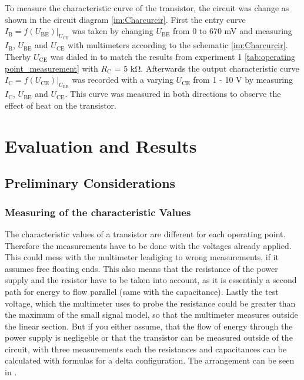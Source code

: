 \documentclass[11pt, a4paper]{article}
\begin{document}
To measure the characteristic curve of the transistor, the circuit was change as shown in the circuit diagram \ref{im:Charcurcir}. 
First the entry curve $I_{\text{B}}=f(U_{\text{BE}})|_{U_{\text{CE}}}$ was taken by changing $U_{\text{BE}}$ from 0 to 670 \si{\milli\volt} and measuring $I_{\text{B}}$,
$U_{\text{BE}}$ and $U_{\text{CE}}$ with multimeters according to the schematic \ref{im:Charcurcir}. Therby $U_{\text{CE}}$ was dialed in to match the results from experiment 1 \ref{tab:operating point_measurement} with $R_{\text{C}}$ = 5 \si{\kilo\ohm}.
Afterwards the output characteristic curve $I_{\text{C}} = f(U_{\text{CE}})|_{U_{\text{BE}}}$ was recorded with a varying $U_{\text{CE}}$ from 1 - 10 \si{\volt} by measuring $I_{\text{C}}$, $U_{\text{BE}}$ and $U_{\text{CE}}$. This curve was measured in both directions to observe the effect of heat on the transistor.

\section{Evaluation and Results}
\FloatBarrier
\subsection{Preliminary Considerations}

\subsubsection{Measuring of the characteristic Values}
The characteristic values of a transistor are different for each operating point. Therefore the measurements have to be done with the voltages already applied. This could mess with the multimeter leadiging to wrong measurements, if it assumes free floating ends. This also means that the resistance of the power supply and the resistor have to be taken into account, as it is essentialy a second path for energy to flow parallel (same with the capacitance). Lastly the test voltage, which the multimeter uses to probe the resistance could be greater than the maximum of the small signal model, so that the multimeter measures outside the linear section. But if you either assume, that the flow of energy through the power supply is negligeble or that the transistor can be measured outside of the circuit, with three measurements each the resistances and capacitances can be calculated with formulas for a delta configuration. The arrangement can be seen in \cite[figure 11]{TRA}.
\end{document}
